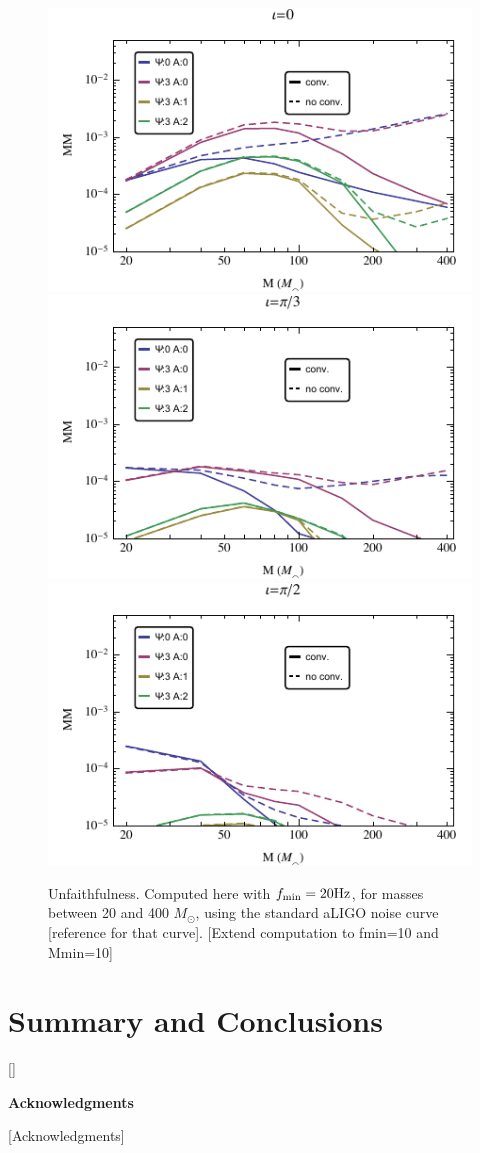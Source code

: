 \documentclass[aps,showpacs,twocolumn,
prd,superscriptaddress,nofootinbib]{revtex4-1}
\newcommand{\Msol}{M_{\odot}}
\newcommand{\SM}[1]{{\color{Red} #1}}
\begin{document}
\begin{figure}
  \includegraphics[width=.32\linewidth]{plots/mismatches_--_inc0.pdf}
  \hspace{0.1cm}
  \includegraphics[width=.32\linewidth]{plots/mismatches_--_incpi3.pdf}
  \hspace{0.1cm}
  \includegraphics[width=.32\linewidth]{plots/mismatches_--_incpi2.pdf}
  \caption{Unfaithfulness. Computed here with $f_{\rm min} = 20\mathrm{Hz}$, for masses between 20 and 400 $\Msol$, using the standard aLIGO noise curve \SM{[reference for that curve]}. \SM{[Extend computation to fmin=10 and Mmin=10]} }
  \label{fig:precunfaithfulness}
\end{figure}


\section{Summary and Conclusions}
\label{sec:discussion}

[]


\vspace{4.5mm}

\hspace{0.85in}
{\bf Acknowledgments}

\vspace{3.5mm}

[Acknowledgments]

\end{document}

